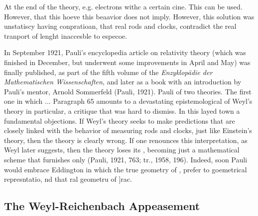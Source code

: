\documentclass[draft]{article}
\begin{document}
{At the end of the theory, e.g. electrons withc a certain cine. This can be used. However, that this hoeve this beaavior does not imply. However, this solution was unstatiscy having conpratioan, that real rods and clocks, contradict the real tranport of lenght inaccesble to especoe.

In September 1921, Pauli's encyclopedia article on relativity theory (which was finished in December, but underwent some improvements in April and May) was finally published, as part of the fifth volume of the \textit{Enzyklopädie der Mathematischen Wissenschaften}, and later as a book with an introduction by Pauli's mentor, Arnold Sommerfeld (Pauli, 1921). Pauli of two theories. The first one in which  ... Paragraph 65 amounts to a devastating epistemological  of Weyl's theory in particular, a critique that was hard to dismiss.  In this layed town a fundamental objections. If Weyl's theory seeks to make predictions that are closely linked with the behavior of measuring rods and clocks, just like Einstein's theory, then the theory is clearly wrong. If one renounces this interpretation, as Weyl later suggests, then the theory loses its , becoming just a mathematical scheme that furnishes only  (Pauli, 1921, 763; tr., 1958, 196).  Indeed, soon Pauli would embrace Eddington in which the true geometry of \spti, prefer to goemetrical represntatio, nd that ral geometru of ]rac.

\subsection{The Weyl-Reichenbach Appeasement}




}
\end{document}
